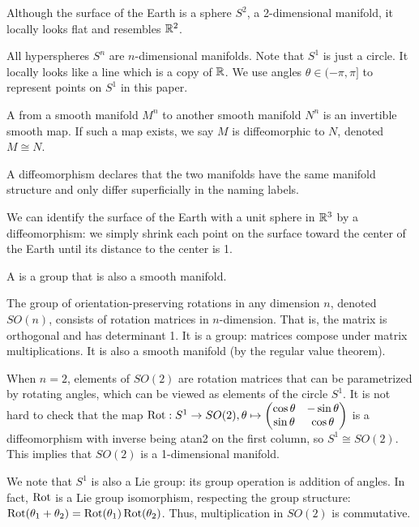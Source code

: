 \documentclass[12pt]{article}
\begin{document}
\begin{eg}[Earth]
Although the surface of the Earth is a sphere $ S^2$, a 2-dimensional manifold, it locally looks flat and resembles $ \mathbb{R}^2$. 
\end{eg}
\begin{eg}[$ S^n$]
	All hyperspheres $ S^{n}$ are $ n$-dimensional manifolds. Note that $ S^{1}$ is just a circle. It locally looks like a line which is a copy of $ \mathbb{R}$. We use angles $\theta \in (-\pi,\pi]$ to represent points on $ S^{1}$ in this paper.
\end{eg}
\begin{defn}
A  from a smooth manifold $ M^{n}$ to another smooth manifold $ N^{n}$ is an invertible smooth map. If such a map exists, we say $ M$ is diffeomorphic to  $ N$, denoted  $ M \cong N$. 
\end{defn}
A diffeomorphism declares that the two manifolds have the same manifold structure and only differ superficially in the naming labels.
\begin{eg}
We can identify the surface of the Earth with a unit sphere in $ \mathbb{R}^3$ by a diffeomorphism: we simply shrink each point on the surface toward the center of the Earth until its distance to the center is 1.
\end{eg}
\begin{defn}
A  is a group that is also a smooth manifold. 
\end{defn}
\begin{eg}[$SO(n)$]
The group of orientation-preserving rotations in any dimension $ n$, denoted $ SO(n)$, consists of rotation matrices in $ n$-dimension. That is, the matrix is orthogonal and has determinant 1. It is a group: matrices compose under matrix multiplications. It is also a smooth manifold (by the regular value theorem).

When $ n=2$, elements of $ SO(2)$ are rotation matrices that can be parametrized by rotating angles, which can be viewed as elements of the circle $ S^{1}$. It is not hard to check that the map $\operatorname{Rot}: S^{1} \to SO(2), \theta \mapsto \begin{pmatrix} \cos \theta & -\sin \theta \\ \sin \theta & \cos \theta \end{pmatrix}$ is a diffeomorphism with inverse being \textsf{atan2}  on the first column, so $ S^{1} \cong SO(2)$. This implies that $ SO(2)$ is a 1-dimensional manifold.

We note that $ S^{1}$ is also a Lie group: its group operation is addition of angles. In fact, $ \operatorname{Rot}$ is a Lie group isomorphism, respecting the group structure: $ \operatorname{Rot}(\theta_1 + \theta_2) = \operatorname{Rot}(\theta_1) \operatorname{Rot}(\theta_2)$. Thus, multiplication in $ SO(2)$ is commutative.
\end{eg}
\end{document}
